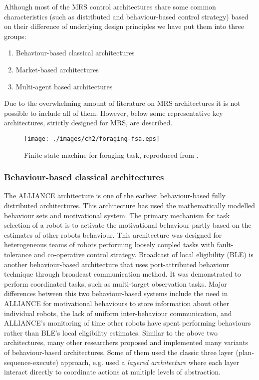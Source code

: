 Although most of the MRS control architectures share some common characteristics (such as distributed and behaviour-based control strategy) based on their difference of underlying design principles we have put them into three groups:
\begin{enumerate}
\item Behaviour-based classical architectures
\item Market-based architectures
\item Multi-agent based architectures
\end{enumerate}
Due to the overwhelming amount of literature on MRS architectures it is not possible to include all of them. However, below some representative key architectures, strictly designed for MRS, are described. 
\begin{figure}
\begin{center}
\texttt{[image: ./images/ch2/foraging-fsa.eps]} %
\caption{Finite state machine for foraging task, reproduced from \protect{}.} 
\label{fig:foraging-fsa}
\end{center}
\end{figure}
\subsubsection*{Behaviour-based classical architectures}
The ALLIANCE architecture \cite{Parker1998} is one of the earliest behaviour-based fully distributed architectures. This architecture has used the mathematically modelled behaviour sets and motivational system. The primary mechanism for task selection of a robot is to activate the motivational behaviour partly based on the estimates of other robots behaviour. This architecture was designed for heterogeneous teams of robots performing loosely coupled tasks with fault-tolerance and co-operative control strategy. Broadcast of local eligibility (BLE) \cite{Werger2001} is another behaviour-based architecture that uses port-attributed behaviour technique through broadcast communication method. It was demonstrated to perform coordinated tasks, such as multi-target observation tasks. Major differences between this two behaviour-based systems include the need in ALLIANCE for motivational behaviours to store information about other individual robots, the lack of uniform inter-behaviour communication, and ALLIANCE's monitoring of time other robots have spent performing behaviours rather than BLE's local eligibility estimates. Similar to the above two architectures, many other researchers proposed and implemented many variants of behaviour-based architectures. Some of them used the classic three layer (plan-sequence-execute) approach,  {e.g.} used a {\em layered architecture} where each layer interact directly to coordinate actions at multiple levels of abstraction. 
